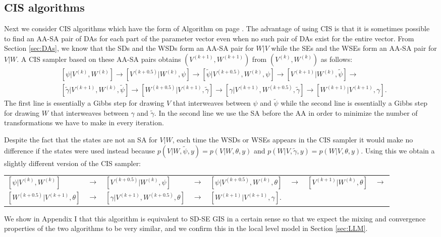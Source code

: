 \documentclass[12pt]{article}
\begin{document}
\subsection{CIS algorithms}\label{sec:Algs:CIS}
Next we consider CIS algorithms which have the form of Algorithm  on page \pageref{alg:CIS}. The advantage of using CIS is that it is sometimes possible to find an AA-SA pair of DAs for each part of the parameter vector even when no such pair of DAs exist for the entire vector. From Section \ref{sec:DAs}, we know that the SDs and the WSDs form an AA-SA pair for $W|V$ while the SEs and the WSEs form an AA-SA pair for $V|W$.  A CIS sampler based on these AA-SA pairs obtains $(V^{(k+1)},W^{(k+1)})$ from $(V^{(k)},W^{(k)})$ as follows:
\begin{align*}
&[\psi|V^{(k)},W^{(k)}] \to [V^{(k+0.5)}|W^{(k)},\psi] \to [\tilde{\psi}|V^{(k+0.5)},W^{(k)},\psi] \to [V^{(k+1)}|W^{(k)},\tilde{\psi}]\to\\
&[\tilde{\gamma}|V^{(k+1)},W^{(k)},\tilde{\psi}] \to [W^{(k+0.5)}|V^{(k+1)},\tilde{\gamma}] \to [\gamma|V^{(k+1)},W^{(k+0.5)},\tilde{\gamma}]\to [W^{(k+1)}|V^{(k+1)},\gamma].
\end{align*}
The first line is essentially a Gibbs step for drawing $V$ that interweaves between $\psi$ and $\tilde{\psi}$ while the second line is essentially a Gibbs step for drawing $W$ that interweaves between $\gamma$ and $\tilde{\gamma}$. In the second line we use the SA before the AA in order to minimize the number of transformations we have to make in every iteration. 

Despite the fact that the states are not an SA for $V|W$, each time the WSDs or WSEs appears in the CIS sampler it would make no difference if the states were used instead because $p(V|W,\tilde{\psi},y)=p(V|W,\theta,y)$ and $p(W|V,\tilde{\gamma},y)=p(W|V,\theta,y)$. Using this we obtain a slightly different version of the CIS sampler:
{\small
\begin{center}
\begin{tabular}{llllllll}
$[\psi|V^{(k)},W^{(k)}]$ & $\to$ & $[V^{(k+0.5)}|W^{(k)},\psi]$ & $\to$ & $[\psi|V^{(k+0.5)},W^{(k)},\theta]$ & $\to$ & $[V^{(k+1)}|W^{(k)},\theta]$ & $\to$ \\
$[W^{(k+0.5)}|V^{(k+1)},\theta]$ & $\to$ & $[\gamma|V^{(k+1)},W^{(k+0.5)},\theta]$ & $\to$ & $[W^{(k+1)}|V^{(k+1)},\gamma]$.&&&
\end{tabular}
\end{center}
}
\noindent We show in Appendix I that this algorithm is equivalent to SD-SE GIS in a certain sense so that we expect the mixing and convergence properties of the two algorithms to be very similar, and we confirm this in the local level model in Section \ref{sec:LLM}.
\end{document}
